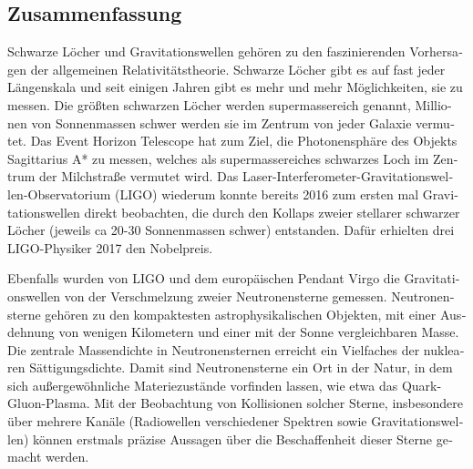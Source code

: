 
\begin{otherlanguage}{german}
\begin{fullwidth}

\begin{center}
\begin{adjustwidth}{1cm}{1cm}

\chapter*{Zusammenfassung}\label{chapter:zusammenfassung}

Schwarze Löcher und Gravitationswellen gehören zu den faszinierenden Vorhersagen
der allgemeinen Relativitäts\-theorie. Schwarze Löcher gibt es auf fast jeder
Längenskala und seit einigen Jahren gibt es mehr und mehr Möglich\-keiten, sie
zu messen. Die größten schwarzen Löcher werden supermassereich genannt, 
Millionen
von Sonnenmassen schwer werden sie im Zentrum von jeder Galaxie vermutet.
Das Event Horizon Telescope hat zum Ziel, die Photonensphäre des Objekts
Sagittarius A* zu messen, welches als supermassereiches schwarzes Loch im Zentrum
der Milchstraße vermutet wird. Das
Laser-Interferometer-Gravitationswellen-Observatorium (LIGO) wiederum
konnte bereits 2016 zum ersten mal Gravitationswellen direkt beobachten, die
durch den Kollaps zweier stellarer schwarzer Löcher (jeweils ca 20-30 Sonnenmassen
schwer) entstanden. Dafür erhielten drei LIGO-Physiker 2017 den Nobelpreis.

Ebenfalls wurden von LIGO und dem europäischen Pendant Virgo die Gravitationswellen
von der Verschmelzung zweier Neutronensterne gemessen. Neutronensterne gehören zu
den kompaktesten astrophysikalischen Objekten, mit einer Ausdehnung von wenigen Kilometern und
einer mit der Sonne vergleichbaren Masse. Die zentrale Massendichte in
Neutronensternen erreicht ein Vielfaches der nuklearen Sättigungsdichte. Damit
sind Neutronensterne ein Ort in der Natur, in dem sich außergewöhnliche
Materiezustände vorfinden lassen, wie etwa das Quark-Gluon-Plasma.
Mit der Beobachtung von Kollisionen solcher Sterne, insbesondere über mehrere
Kanäle (Radiowellen verschiedener Spektren sowie Gravitationswellen) können erstmals
präzise Aussagen über die Beschaffenheit dieser Sterne gemacht werden.


\end{adjustwidth}
\end{center}
\end{fullwidth}
\end{otherlanguage}
